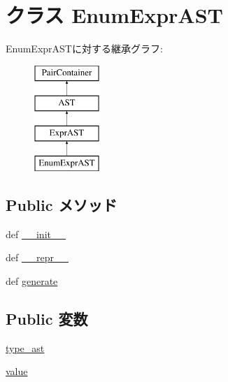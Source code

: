 \hypertarget{classslicc_1_1ast_1_1EnumExprAST_1_1EnumExprAST}{
\section{クラス EnumExprAST}
\label{classslicc_1_1ast_1_1EnumExprAST_1_1EnumExprAST}
}
EnumExprASTに対する継承グラフ:\begin{figure}[H]
\begin{center}
\leavevmode
\includegraphics[height=4cm]{classslicc_1_1ast_1_1EnumExprAST_1_1EnumExprAST}
\end{center}
\end{figure}
\subsection*{Public メソッド}
\begin{DoxyCompactItemize}
\item 
def \hyperlink{classslicc_1_1ast_1_1EnumExprAST_1_1EnumExprAST_ac775ee34451fdfa742b318538164070e}{\_\-\_\-init\_\-\_\-}
\item 
def \hyperlink{classslicc_1_1ast_1_1EnumExprAST_1_1EnumExprAST_ad8b9328939df072e4740cd9a63189744}{\_\-\_\-repr\_\-\_\-}
\item 
def \hyperlink{classslicc_1_1ast_1_1EnumExprAST_1_1EnumExprAST_a4555d1cee0dccf3942ea35fe86de2e8e}{generate}
\end{DoxyCompactItemize}
\subsection*{Public 変数}
\begin{DoxyCompactItemize}
\item 
\hyperlink{classslicc_1_1ast_1_1EnumExprAST_1_1EnumExprAST_a2c41e611550596541faa6f64ffecc139}{type\_\-ast}
\item 
\hyperlink{classslicc_1_1ast_1_1EnumExprAST_1_1EnumExprAST_afcc7a4b78ecd8fa7e713f8cfa0f51017}{value}
\end{DoxyCompactItemize}


